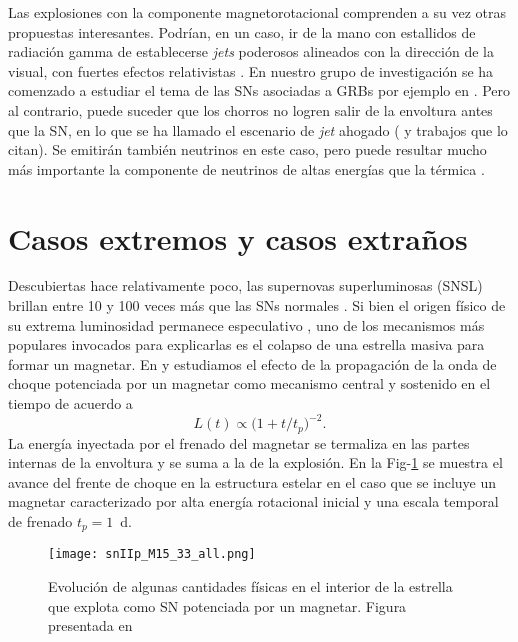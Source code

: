 \documentclass[baaa]{baaa}
\begin{document}
Las explosiones con la componente magnetorotacional comprenden a su vez otras propuestas interesantes. Podrían, en un caso, ir de la mano con estallidos de radiación gamma de establecerse {\em jets} poderosos alineados con la dirección de la visual, con fuertes efectos relativistas \cite{2021Aloy} . En nuestro grupo de investigación se ha comenzado a estudiar el tema de las SNs asociadas a GRBs por ejemplo en \cite{2023Roman}. Pero al contrario, puede suceder que los chorros no logren salir de la envoltura antes que la SN, en lo que se ha llamado el escenario de {\em jet} ahogado (\citealt{2016Senno} y trabajos que lo citan). Se emitirán también neutrinos en este caso, pero puede resultar mucho más importante la componente de neutrinos de altas energías que la térmica \cite{2023Reynoso}.\\

\section{Casos extremos y casos extraños}

Descubiertas hace relativamente poco, las supernovas superluminosas (SNSL) brillan entre 10 y 100 veces más que las SNs normales \citep{2007Smith,2019GalYam}. Si bien el origen físico de su extrema luminosidad permanece especulativo \citep{2019Wang}, uno de los mecanismos más populares invocados para explicarlas es el colapso de una estrella masiva para formar un magnetar. En \cite{Bersten2016} y \cite{2018Orellana} estudiamos el efecto de la propagación de la onda de choque potenciada por un magnetar como mecanismo central y sostenido en el tiempo de acuerdo a
 \begin{equation}
 L(t)\propto{\big(1+ t/t_{p}\big)^{-2}}.
 \label{eq1}
\end{equation}
 La energía inyectada por el frenado del magnetar se termaliza en las partes internas de la envoltura y se suma a la de la explosión. En la Fig-\ref{choque} se muestra el avance del frente de choque en la estructura estelar en el caso que se incluye un magnetar caracterizado por alta energía rotacional inicial y una escala temporal de frenado $t_p=1$~d.\\

\begin{figure}[!h]
\centering
\texttt{[image: snIIp\_M15\_33\_all.png]}
\caption{Evolución de algunas cantidades físicas en el interior de la estrella que explota como SN potenciada por un magnetar. Figura presentada en \cite{2018Orellana}} 
\label{choque}
\end{figure}
\end{document}
